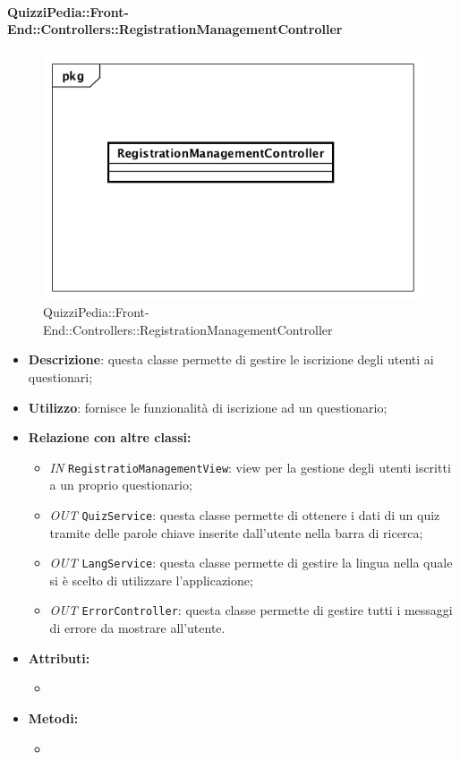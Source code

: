 \paragraph{QuizziPedia::Front-End::Controllers::RegistrationManagementController}
\begin{figure}
	\centering
	\includegraphics[scale=0.45]{UML/Classi/Front-End/QuizziPedia_Front-end_Controller_RegistrationManagementController.png}
	\caption{QuizziPedia::Front-End::Controllers::RegistrationManagementController}
\end{figure}
\begin{itemize}
	\item \textbf{Descrizione}: questa classe permette di gestire le iscrizione degli utenti ai questionari;
	\item \textbf{Utilizzo}: fornisce le funzionalità di iscrizione ad un questionario;
	\item \textbf{Relazione con altre classi:}
	\begin{itemize}
		\item \textit{IN} \texttt{RegistratioManagementView}: view per la gestione degli utenti iscritti a un proprio questionario; 
		\item \textit{OUT} \texttt{QuizService}: questa classe permette di ottenere i dati di un quiz tramite delle parole chiave inserite dall'utente nella barra di ricerca;
		\item \textit{OUT} \texttt{LangService}: questa classe permette di gestire la lingua nella quale si è scelto di utilizzare l'applicazione;
		\item \textit{OUT} \texttt{ErrorController}: questa classe permette di gestire tutti i messaggi di errore da mostrare all'utente.
	\end{itemize}
	\item \textbf{Attributi:}
	\begin{itemize}
		\item 
	\end{itemize}
	\item \textbf{Metodi:}
	\begin{itemize}
		\item 
	\end{itemize}
\end{itemize}

